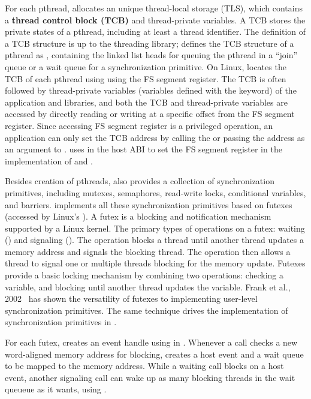 For each pthread, \libpthread{} allocates an unique thread-local storage (TLS), which contains a {\bf thread control block (TCB)} and thread-private variables.
A TCB stores the private states of a pthread, including at least a thread identifier.
The definition of a TCB structure is up to the threading library;
\libpthread{} defines the TCB structure of a pthread as ,
containing the linked list heads for queuing the pthread
in a ``join'' queue or a wait queue for a synchronization primitive.
On \graphenearch{} Linux, \libpthread{}
locates the TCB of each pthread using using the FS segment register.
The TCB is often
followed by thread-private variables (variables defined with the  keyword) of the application
and libraries,
and both the TCB and thread-private variables
are accessed by directly reading or writing at a specific offset from the FS segment register.
Since accessing FS segment register is a privileged operation,
an application can only set the TCB address
by calling the  \linuxapi{} or passing the address as an argument to .
\thelibos{} uses  in the host ABI
to set the FS segment register
in the implementation of  and .


Besides creation of pthreads, \libpthread{} also provides a collection of synchronization primitives, including mutexes, semaphores, read-write locks, conditional variables, and barriers.
\libpthread{} implements all these synchronization primitives based on futexes (accessed by Linux's  \linuxapi{}). %
A futex is a blocking and notification mechanism
supported by a Linux kernel.
The primary types of operations on a futex: 
waiting () and signaling ().
The  operation
blocks a thread until another thread updates a memory address
and signals the blocking thread.
The  operation then allows a thread
to signal one or multiple threads blocking for the memory update.
Futexes provide a basic locking mechanism
by combining two operations: checking a variable, and blocking until
another thread updates the variable.
Frank et al., 2002~\cite{franke02futex} has shown the versatility of futexes
to implementing user-level synchronization primitives. The same technique drives the implementation of synchronization primitives in \libpthread{}.


For each futex, \thelibos{} creates an event handle using  in \thehostabi{}.
Whenever a  call checks a new word-aligned memory address for blocking, \thelibos{} creates a host event and a wait queue to be mapped to the memory address.
While a waiting  call blocks on a host event,
another signaling  call can wake up as many blocking threads in the wait queueue as it wants, using .


